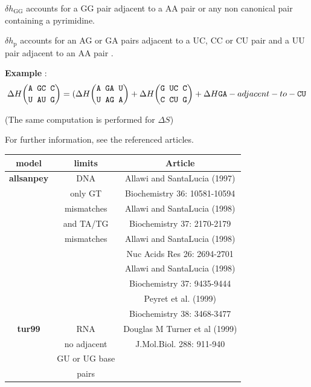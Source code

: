 \documentclass{article}
\begin{document}
$\delta{}h_\mathrm{GG}$ accounts for a GG pair adjacent to a AA pair or any non canonical pair containing a pyrimidine.

$\delta{}h_\mathrm{p}$ accounts for an AG or GA pairs adjacent to a UC, CC or CU pair and a UU pair adjacent to an AA pair .

\textbf{Example} :
\begin{multline*}
\Delta H {\mbox{\texttt{A GC C}} \choose \mbox{\texttt{U AU G}}} =
( \Delta H {\mbox{\texttt{A GA U}} \choose \mbox{\texttt{U AG A}}} + 
\Delta H {\mbox{\texttt{G UC C}} \choose \mbox{\texttt{C CU G}}} +
\Delta H {\mbox{\texttt{GA}} -adjacent-to- \mbox{\texttt{CU}} } \\
\end{multline*}

       (The same computation is performed for $\Delta S$)
       
For further information, see the referenced articles.

\begin{table}[h][c]
\begin{tabular}[h]{| c | c | c |}
\textbf{model} & \textbf{limits} & \textbf{Article} \\
 \hline
\textbf{allsanpey} & DNA & Allawi and SantaLucia (1997) \\
 & only GT & Biochemistry 36: 10581-10594 \\
 & mismatches & Allawi and SantaLucia (1998) \\
 & and TA/TG & Biochemistry 37: 2170-2179 \\
 & mismatches & Allawi and SantaLucia (1998) \\
 & & Nuc Acids Res 26: 2694-2701 \\
 & & Allawi and SantaLucia (1998) \\
 & & Biochemistry 37: 9435-9444 \\
 & & Peyret et al. (1999) \\
 & & Biochemistry 38: 3468-3477\\
 \hline
\textbf{tur99} & RNA & Douglas M Turner et al (1999) \\
 & no adjacent & J.Mol.Biol.  288: 911-940 \\
 & GU or UG base & \\
 &  pairs & \\
 \hline
\end{tabular}
\end{table}
\end{document}
